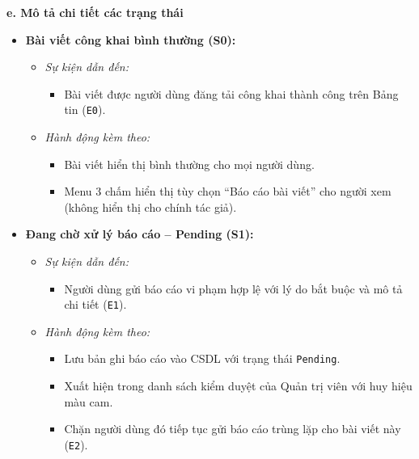 \documentclass[11pt,a4paper]{article}
\begin{document}
\noindent\textbf{e. Mô tả chi tiết các trạng thái}
\begin{itemize}[leftmargin=1.2cm, noitemsep]
    \item[\textbf{--}] \textbf{Bài viết công khai bình thường (S0):}
    \begin{itemize}[leftmargin=0.8cm, label=--, noitemsep]
        \item \textit{Sự kiện dẫn đến:}
        \begin{itemize}[leftmargin=0.6cm, label=$\ast$, noitemsep]
            \item Bài viết được người dùng đăng tải công khai thành công trên Bảng tin (\texttt{E0}).
        \end{itemize}
        \item \textit{Hành động kèm theo:}
        \begin{itemize}[leftmargin=0.6cm, label=$\ast$, noitemsep]
            \item Bài viết hiển thị bình thường cho mọi người dùng.
            \item Menu 3 chấm hiển thị tùy chọn ``Báo cáo bài viết'' cho người xem (không hiển thị cho chính tác giả).
        \end{itemize}
    \end{itemize}

    \item[\textbf{--}] \textbf{Đang chờ xử lý báo cáo -- Pending (S1):}
    \begin{itemize}[leftmargin=0.8cm, label=--, noitemsep]
        \item \textit{Sự kiện dẫn đến:}
        \begin{itemize}[leftmargin=0.6cm, label=$\ast$, noitemsep]
            \item Người dùng gửi báo cáo vi phạm hợp lệ với lý do bắt buộc và mô tả chi tiết (\texttt{E1}).
        \end{itemize}
        \item \textit{Hành động kèm theo:}
        \begin{itemize}[leftmargin=0.6cm, label=$\ast$, noitemsep]
            \item Lưu bản ghi báo cáo vào CSDL với trạng thái \texttt{Pending}.
            \item Xuất hiện trong danh sách kiểm duyệt của Quản trị viên với huy hiệu màu cam.
            \item Chặn người dùng đó tiếp tục gửi báo cáo trùng lặp cho bài viết này (\texttt{E2}).
        \end{itemize}
    \end{itemize}


\end{itemize}
\end{document}
